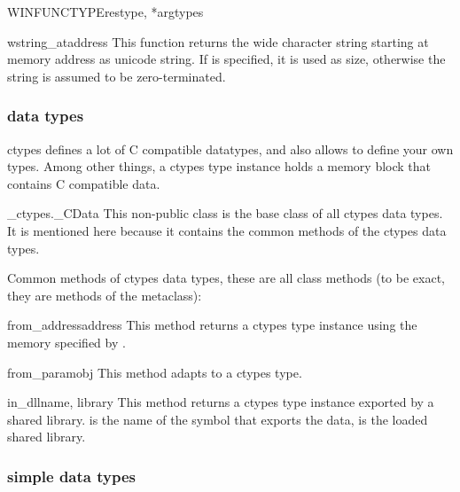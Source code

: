 \begin{funcdesc}{WINFUNCTYPE}{restype, *argtypes}
\end{funcdesc}

\begin{funcdesc}{wstring_at}{address}
This function returns the wide character string starting at memory
address  as unicode string.  If  is specified,
it is used as size, otherwise the string is assumed to be
zero-terminated.
\end{funcdesc}

\subsubsection{data types}

ctypes defines a lot of C compatible datatypes, and also allows to
define your own types.  Among other things, a ctypes type instance
holds a memory block that contains C compatible data.

\begin{classdesc}{_ctypes._CData}{}
This non-public class is the base class of all ctypes data types.  It
is mentioned here because it contains the common methods of the ctypes
data types.
\end{classdesc}

Common methods of ctypes data types, these are all class methods (to
be exact, they are methods of the metaclass):

\begin{methoddesc}{from_address}{address}
This method returns a ctypes type instance using the memory specified
by . 
\end{methoddesc}

\begin{methoddesc}{from_param}{obj}
This method adapts  to a ctypes type.
\end{methoddesc}

\begin{methoddesc}{in_dll}{name, library}
This method returns a ctypes type instance exported by a shared
library.   is the name of the symbol that exports the data,
 is the loaded shared library.
\end{methoddesc}

\subsubsection{simple data types}

